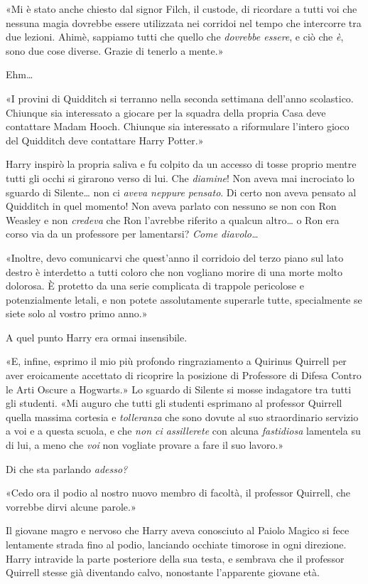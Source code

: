 «Mi è stato anche chiesto dal signor Filch, il custode, di ricordare a tutti voi che nessuna magia dovrebbe essere utilizzata nei corridoi nel tempo che intercorre tra due lezioni. Ahimè, sappiamo tutti che quello che \textit{dovrebbe essere}, e ciò che \textit{è}, sono due cose diverse. Grazie di tenerlo a mente.»

Ehm…

«I provini di Quidditch si terranno nella seconda settimana dell’anno scolastico. Chiunque sia interessato a giocare per la squadra della propria Casa deve contattare Madam Hooch. Chiunque sia interessato a riformulare l’intero gioco del Quidditch deve contattare Harry Potter.»

Harry inspirò la propria saliva e fu colpito da un accesso di tosse proprio mentre tutti gli occhi si girarono verso di lui. Che \textit{diamine}! Non aveva mai incrociato lo sguardo di Silente… non ci \textit{aveva neppure pensato}. Di certo non aveva pensato al Quidditch in quel momento! Non aveva parlato con nessuno se non con Ron Weasley e non \textit{credeva} che Ron l’avrebbe riferito a qualcun altro… o Ron era corso via da un professore per lamentarsi? \textit{Come diavolo…}

«Inoltre, devo comunicarvi che quest’anno il corridoio del terzo piano sul lato destro è interdetto a tutti coloro che non vogliano morire di una morte molto dolorosa. È protetto da una serie complicata di trappole pericolose e potenzialmente letali, e non potete assolutamente superarle tutte, specialmente se siete solo al vostro primo anno.»

A quel punto Harry era ormai insensibile.

«E, infine, esprimo il mio più profondo ringraziamento a Quirinus Quirrell per aver eroicamente accettato di ricoprire la posizione di Professore di Difesa Contro le Arti Oscure a Hogwarts.» Lo sguardo di Silente si mosse indagatore tra tutti gli studenti. «Mi auguro che tutti gli studenti esprimano al professor Quirrell quella massima cortesia e \textit{tolleranza} che sono dovute al suo straordinario servizio a voi e a questa scuola, e che \textit{non ci assillerete} con alcuna \textit{fastidiosa} lamentela su di lui, a meno che \textit{voi} non vogliate provare a fare il suo lavoro.»

Di che sta parlando \textit{adesso?}

«Cedo ora il podio al nostro nuovo membro di facoltà, il professor Quirrell, che vorrebbe dirvi alcune parole.»

Il giovane magro e nervoso che Harry aveva conosciuto al Paiolo Magico si fece lentamente strada fino al podio, lanciando occhiate timorose in ogni direzione. Harry intravide la parte posteriore della sua testa, e sembrava che il professor Quirrell stesse già diventando calvo, nonostante l’apparente giovane età.

